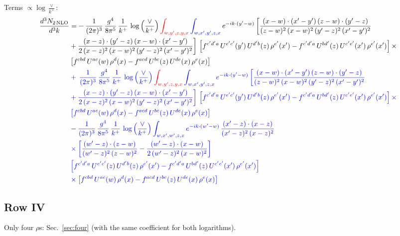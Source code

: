 \documentclass[10pt]{article}
\numberwithin{equation}{section}
\newcommand{\new}[1]{{\color{blue}#1}}
\newcommand{\old}[1]{{\color{red}#1}}
\newcommand{\nc}{\color{blue}}
\begin{document}
\noindent Terms $\propto\log\frac{\vee}{k^+}$:
\begin{align}
 \frac{d^{3}N_{2\,\rm NLO}}{d^{3}k} & =    -\, \frac{1}{(2\pi)^{3}}\,\frac{g^{4}}{8\pi^{5}}\,\frac{1}{k^{+}}\,\log{\left(\frac{\vee}{k^{+}}\right)}\,\old{\int_{w,y',z,y,x}}\,\new{\int_{w,x',y',z,x}}\, e^{-ik\cdot (y'-w)}\,\bigg[\frac{(x-w)\cdot (x'-y')\,(z-w)\cdot (y'-z)}{(z-w)^{2}\,(x-w)^{2}\,(y'-z)^{2}\,(x'-y')^{2}}\notag \\ & +\frac{(x-z)\cdot (y'-z)\,(x-w)\cdot (x'-y')}{2\,(x-z)^{2}\,(x-w)^{2}\,(y'-z)^{2}\,(x'-y')^{2}}\bigg]\, \left[f^{c'd'a}\,U^{e'c'}(y')\,U^{d'b}(z)\,\rho^{e'}(x')-f^{c'd'a}\, 
    U^{bd'}(z)\,U^{c'e'}(x')\,\rho^{e'}(x')\right]\times\notag \\ &  \left[f^{cbd}\,U^{ac}(w)\,\rho^{d}(x) -f^{acd}\,U^{bc}(z)\,U^{de}(x)\,\rho^{e}(x)\right] \notag \\
& \nc  +\, \frac{1}{(2\pi)^{3}}\,\frac{g^{4}}{8\pi^{5}}\,\frac{1}{k^{+}}\,\log{\left(\frac{\vee}{k^{+}}\right)}\,\old{\int_{w,y',z,y,x}}\,\new{\int_{w,x',y',z,x}}\, e^{-ik\cdot (y'-w)}\,\bigg[\frac{(x-w)\cdot (x'-y')\,(z-w)\cdot (y'-z)}{(z-w)^{2}\,(x-w)^{2}\,(y'-z)^{2}\,(x'-y')^{2}}\notag \\ & \nc  +\frac{(x-z)\cdot (y'-z)\,(x-w)\cdot (x'-y')}{2\,(x-z)^{2}\,(x-w)^{2}\,(y'-z)^{2}\,(x'-y')^{2}}\bigg]\, \left[f^{c'd'a}\,U^{e'c'}(y')\,U^{d'b}(z)\,\rho^{e'}(x')-f^{c'd'a}\, 
    U^{bd'}(z)\,U^{c'e'}(x')\,\rho^{e'}(x')\right]\times\notag \\ & \nc   \left[f^{cbd}\,U^{ac}(w)\,\rho^{d}(x) -f^{acd}\,U^{bc}(z)\,U^{de}(x)\,\rho^{e}(x)\right] \notag \\
& \nc  -\frac{1}{(2\pi)^{3}}\,\frac{g^{4}}{8\pi^{5}}\,\frac{1}{k^{+}}\,\log{\left(\frac{\vee}{k^{+}}\right)}\int_{w,x',w',z,x} e^{-ik\cdot (w'-w)}\,\frac{(x'-z)\cdot (x-z)}{(x'-z)^{2}\,(x-z)^{2}}\notag \\
& \nc  \times\bigg[\frac{(w'-z)\cdot (z-w)}{(w'-z)^{2}\,(z-w)^{2}}-\frac{(w'-z)\cdot (x-w)}{2\,(w'-z)^{2}\,(x-w)^{2}}\bigg]\notag \\
& \nc  \left[f^{c'd'a}\,U^{e'c'}(z)\,U^{d'b}(z)\,\rho^{e'}(x')-f^{c'd'a}\, U^{bd'}(z)\,U^{c'e'}(x')\,\rho^{e'}(x')\right]\notag \\
& \nc  \times\left[f^{cbd}\,U^{ac}(w)\,\rho^{d}(x) -f^{acd}\,U^{bc}(z)\,U^{de}(x)\,\rho^{e}(x)\right] \label{eq:B:G3III2}
\end{align}

\subsection{Row IV}
Only four $\rho$\textquotesingle s: Sec.~\ref{sec:four} (with the same coefficient for both logarithms).
\end{document}
